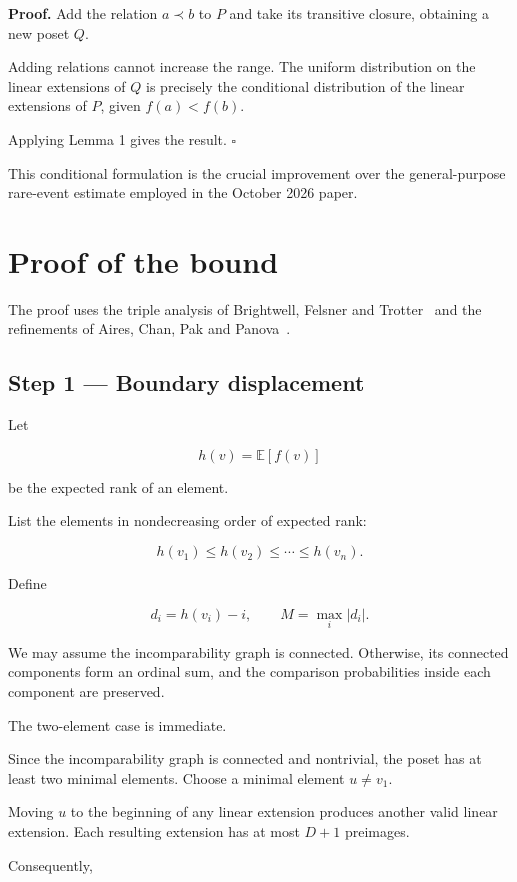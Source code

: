 \documentclass[11pt]{article}
\begin{document}
\textbf{Proof.} Add the relation \(a\prec b\) to \(P\) and take its transitive closure, obtaining a new poset \(Q\).

Adding relations cannot increase the range. The uniform distribution on the linear extensions of \(Q\) is precisely the conditional distribution of the linear extensions of \(P\), given \(f(a)<f(b)\).

Applying Lemma 1 gives the result. \(\square\)

This conditional formulation is the crucial improvement over the general-purpose rare-event estimate employed in the October 2026 paper.

\section{Proof of the bound}

The proof uses the triple analysis of Brightwell, Felsner and Trotter~\cite{BFT} and the refinements of Aires, Chan, Pak and Panova~\cite{ACPP}.



\subsection{Step 1 --- Boundary displacement}

Let

\[
h(v)=\mathbb E[f(v)]
\]

be the expected rank of an element.

List the elements in nondecreasing order of expected rank:

\[
h(v_1)\leq h(v_2)\leq\cdots\leq h(v_n).
\]

Define

\[
d_i=h(v_i)-i,
\qquad
M=\max_i|d_i|.
\]

We may assume the incomparability graph is connected. Otherwise, its connected components form an ordinal sum, and the comparison probabilities inside each component are preserved.

The two-element case is immediate.

Since the incomparability graph is connected and nontrivial, the poset has at least two minimal elements. Choose a minimal element \(u\ne v_1\).

Moving \(u\) to the beginning of any linear extension produces another valid linear extension. Each resulting extension has at most \(D+1\) preimages.

Consequently,
\end{document}
